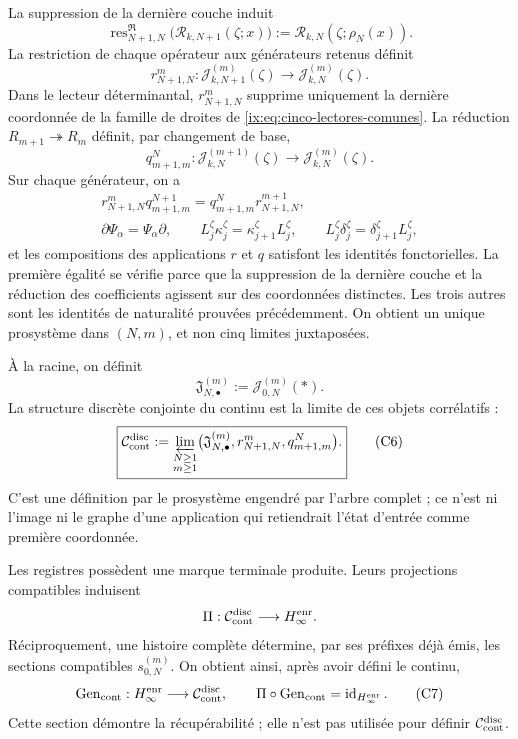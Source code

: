 La suppression de la dernière couche induit
\[
 \operatorname{res}^{\mathfrak R}_{N+1,N}
 \bigl(\mathscr R_{k,N+1}(\zeta;x)\bigr)
 :=\mathscr R_{k,N}(\zeta;\rho_N(x)).
\]
La restriction de chaque opérateur aux générateurs retenus définit
\[
 r^m_{N+1,N}:\mathcal J_{k,N+1}^{(m)}(\zeta)
 \longrightarrow\mathcal J_{k,N}^{(m)}(\zeta).
\]
Dans le lecteur déterminantal, \(r^m_{N+1,N}\) supprime uniquement la dernière coordonnée de la famille de droites de \eqref{ix:eq:cinco-lectores-comunes}. La réduction \(R_{m+1}\twoheadrightarrow R_m\) définit, par changement de base,
\[
 q^N_{m+1,m}:\mathcal J_{k,N}^{(m+1)}(\zeta)
 \longrightarrow\mathcal J_{k,N}^{(m)}(\zeta).
\]
Sur chaque générateur, on a
\[
\begin{gathered}
 r^m_{N+1,N}q^{N+1}_{m+1,m}
 =q^N_{m+1,m}r^{m+1}_{N+1,N},\\
 \partial\Psi_\alpha=\Psi_\alpha\partial,
 \qquad L_j^\zeta\kappa_j^\zeta
       =\kappa_{j+1}^\zeta L_j^\zeta,
 \qquad L_j^\zeta\delta_j^\zeta
       =\delta_{j+1}^\zeta L_j^\zeta,
\end{gathered}
\tag{C4}
\label{ix:eq:naturalidad-D}
\]
et les compositions des applications \(r\) et \(q\) satisfont les identités
fonctorielles. La première égalité se vérifie parce que la suppression de la dernière couche et
la réduction des coefficients agissent sur des coordonnées distinctes. Les trois autres
sont les identités de naturalité prouvées précédemment. On obtient un unique
prosystème dans \((N,m)\), et non cinq limites juxtaposées.

À la racine, on définit
\[
 \mathfrak J_{N,\bullet}^{(m)}:=\mathcal J_{0,N}^{(m)}(\ast).
\tag{C5}
\label{ix:eq:fibras-conjuntas-horizonte}
\]
La structure discrète conjointe du continu est la limite de ces objets corrélatifs :
\[
 \boxed{
 \mathcal C_{\rm cont}^{\rm disc}
 :=\varprojlim_{\substack{N\geq1\\m\geq1}}
   \bigl(\mathfrak J_{N,\bullet}^{(m)},
         r^m_{N+1,N},q^N_{m+1,m}\bigr).}
\tag{C6}
\label{ix:eq:continuo-discreto}
\]
C'est une définition par le prosystème engendré par l'arbre complet ; ce n'est
ni l'image ni le graphe d'une application qui retiendrait l'état d'entrée comme
première coordonnée.

Les registres possèdent une marque terminale produite. Leurs projections compatibles induisent
\[
 \Pi:\mathcal C_{\rm cont}^{\rm disc}\longrightarrow H_\infty^{\rm enr}.
\]
Réciproquement, une histoire complète détermine, par ses préfixes déjà émis, les sections compatibles \(s_{0,N}^{(m)}\). On obtient ainsi, après avoir défini le continu,
\[
 \operatorname{Gen}_{\rm cont}:H_\infty^{\rm enr}
 \longrightarrow\mathcal C_{\rm cont}^{\rm disc},
 \qquad
 \Pi\circ\operatorname{Gen}_{\rm cont}
 =\operatorname{id}_{H_\infty^{\rm enr}}.
\tag{C7}
\label{ix:eq:seccion-historias-continuo}
\]
Cette section démontre la récupérabilité ; elle n'est pas utilisée pour définir
\(\mathcal C_{\rm cont}^{\rm disc}\).


